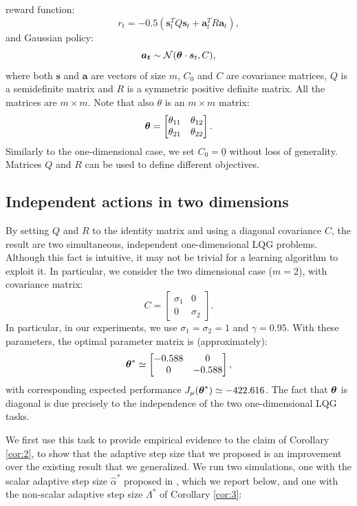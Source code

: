 reward function:
\[
	r_t=-0.5(\boldsymbol{s}_t^TQ\boldsymbol{s}_t + \boldsymbol{a}_t^TR\boldsymbol{a}_t),
\]
and Gaussian policy:
\[
	\boldsymbol{a_t} \sim \mathcal{N}(\boldsymbol{\theta} \cdot \boldsymbol{s}_t,C),
\]
where both $\boldsymbol{s}$ and $\boldsymbol{a}$ are vectors of size $m$, $C_0$ and $C$ are covariance matrices, $Q$ is a semidefinite matrix and $R$ is a symmetric positive definite matrix. All the matrices are $m\times m$. Note that also $\theta$ is an $m \times m$ matrix:
\[
\boldsymbol{\theta} = \begin{bmatrix}
\theta_{11} & \theta_{12} \\
\theta_{21} & \theta_{22}
\end{bmatrix}.
\]
Similarly to the one-dimensional case, we set $C_0=\underline{0}$ without loss of generality. Matrices $Q$ and $R$ can be used to define different objectives.

\subsection{Independent actions in two dimensions}
By setting $Q$ and $R$ to the identity matrix and using a diagonal covariance $C$, the result are two simultaneous, independent one-dimensional \ac{LQG} problems. Although this fact is intuitive, it may not be trivial for a learning algorithm to exploit it. In particular, we consider the two dimensional case ($m=2$), with covariance matrix:
\[
	C = 
	\begin{bmatrix}
	\sigma_1 & 0 		\\
	0		 & \sigma_2
	\end{bmatrix}.
\]
In particular, in our experiments, we use $\sigma_1 = \sigma_2 = 1$ and $\gamma = 0.95$. With these parameters, the optimal parameter matrix is (approximately):
\[
	\boldsymbol{\theta}^* \simeq 
	\begin{bmatrix}
	-0.588 & 0 		\\
	0		 & -0.588
	\end{bmatrix},
\]
with corresponding expected performance $J_\mu(\boldsymbol{\theta}^*) \simeq -422.616$. The fact that $\boldsymbol{\theta}$ is diagonal is due precisely to the independence of the two one-dimensional \ac{LQG} tasks.

We first use this task to provide empirical evidence to the claim of Corollary \ref{cor:2}, \ie to show that the adaptive step size that we proposed is an improvement over the existing result that we generalized. We run two simulations, one with the scalar adaptive step size $\hat{\alpha}^*$ proposed in \cite{NIPS2013_5186}, which we report below, and one with the non-scalar adaptive step size $\Lambda^*$ of Corollary \ref{cor:3}:

